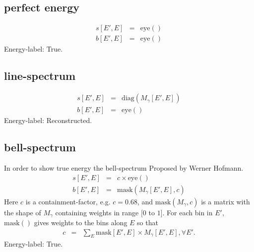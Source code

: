 \documentclass{article}%
\begin{document}
\subsection{perfect energy}
\begin{eqnarray}
s[E', E] &=& \mathrm{eye}()
\\
b[E', E] &=& \mathrm{eye}()
\end{eqnarray}
%
Energy-label: True.
%
\subsection{line-spectrum}
\begin{eqnarray}
s[E', E] &=& \mathrm{diag}(M_{\gamma}[E',E])
\\
b[E', E] &=& \mathrm{eye}()
\end{eqnarray}
%
Energy-label: Reconstructed.
%
\subsection{bell-spectrum}
%
In order to show true energy the bell-spectrum
%
Proposed by Werner Hofmann.
\begin{eqnarray}
s[E', E] &=& c \times \mathrm{eye}()
\\
b[E', E] &=& \mathrm{mask}(M_{\gamma}[E',E], c)
\end{eqnarray}
%
Here $c$ is a containment-factor, e.g. $c = 0.68$,
%
and $\mathrm{mask}(M_{\gamma}, c)$ is a matrix with the shape of $M_{\gamma}$ containing weights in range $[0$ to $1]$.
%
For each bin in $E'$, $\mathrm{mask}()$ gives weights to the bins along $E$ so that
%
\begin{eqnarray}
c &=& \sum_E \mathrm{mask}[E',E] \times M_{\gamma}[E',E], \forall E'.
\end{eqnarray}
%
Energy-label: True.
%
%
%
\end{document}

